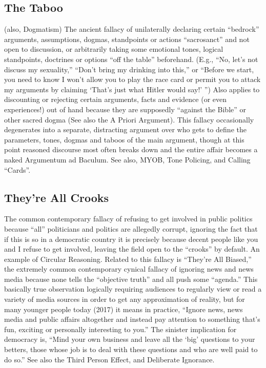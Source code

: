 \documentclass[10pt,a4paper,british]{article}
\begin{document}
\begin{multicols}{2}
    \subsection{The Taboo} (also, Dogmatism) The ancient fallacy of unilaterally declaring certain ``bedrock'' arguments, assumptions, dogmas, standpoints or actions ``sacrosanct'' and not open to discussion, or arbitrarily taking some emotional tones, logical standpoints, doctrines or options ``off the table'' beforehand. (E.g., ``No, let's not discuss my sexuality,'' ``Don't bring my drinking into this,'' or ``Before we start, you need to know I won't allow you to play the race card or permit you to attack my arguments by claiming `That's just what Hitler would say!' '')  Also applies to discounting or rejecting certain arguments, facts and evidence (or even experiences!) out of hand because they are supposedly ``against the Bible'' or other sacred dogma (See also the A Priori Argument). This fallacy occasionally degenerates into a separate, distracting argument over who gets to define the parameters, tones, dogmas and taboos of the main argument, though at this point reasoned discourse most often breaks down and the entire affair becomes a naked Argumentum ad Baculum. See also, MYOB, Tone Policing, and Calling ``Cards''.  

    \subsection{They're All Crooks} The common contemporary fallacy of refusing to get involved in public politics because ``all'' politicians and politics are allegedly corrupt, ignoring the fact that if this is so in a democratic country it is precisely because decent people like you and I refuse to get involved, leaving the field open to the ``crooks'' by default. An example of Circular Reasoning. Related to this fallacy is ``They're All Biased,'' the extremely common contemporary cynical fallacy of ignoring news and news media because none tells the ``objective truth'' and all push some ``agenda.''  This basically true observation logically requiring audiences to regularly view or read a variety of media sources in order to get any approximation of reality, but for many younger people today (2017) it means in practice, ``Ignore news, news media and public affairs altogether and instead pay attention to something that's fun, exciting or personally interesting to you.'' The sinister implication for democracy is, ``Mind your own business and leave all the `big' questions to your betters, those whose job is to deal with these questions and who are well paid to do so.'' See also the Third Person Effect, and Deliberate Ignorance.  


\end{multicols}
\end{document}
